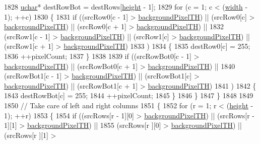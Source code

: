 \begin{DoxyCode}
1828     \hyperlink{namespace_k_k_b_ace9969169bf514f9ee6185186949cdf7}{uchar}*  destRowBot = destRows[\hyperlink{class_k_k_b_1_1_raster_af39ff189de4fbb6de98392e187efafb7}{height} - 1];
1829     \textcolor{keywordflow}{for} (c = 1;  c < (\hyperlink{class_k_k_b_1_1_raster_ae0bcc103e191c3421d7692dc69ceb554}{width}  - 1);  ++c)
1830     \{
1831       \textcolor{keywordflow}{if}  ((srcRow0[c - 1] > \hyperlink{class_k_k_b_1_1_raster_a3c4e96eaf48274f5d8912617f81f2a0b}{backgroundPixelTH})  ||  (srcRow0[c] > 
      \hyperlink{class_k_k_b_1_1_raster_a3c4e96eaf48274f5d8912617f81f2a0b}{backgroundPixelTH})  ||  (srcRow0[c + 1] > \hyperlink{class_k_k_b_1_1_raster_a3c4e96eaf48274f5d8912617f81f2a0b}{backgroundPixelTH})  ||
1832            (srcRow1[c - 1] > \hyperlink{class_k_k_b_1_1_raster_a3c4e96eaf48274f5d8912617f81f2a0b}{backgroundPixelTH})  ||  (srcRow1[c] > 
      \hyperlink{class_k_k_b_1_1_raster_a3c4e96eaf48274f5d8912617f81f2a0b}{backgroundPixelTH})  ||  (srcRow1[c + 1] > \hyperlink{class_k_k_b_1_1_raster_a3c4e96eaf48274f5d8912617f81f2a0b}{backgroundPixelTH})
1833           )
1834       \{
1835         destRow0[c] = 255;
1836         ++pixelCount;
1837       \}
1838 
1839       \textcolor{keywordflow}{if}  ((srcRowBot0[c - 1] > \hyperlink{class_k_k_b_1_1_raster_a3c4e96eaf48274f5d8912617f81f2a0b}{backgroundPixelTH})  ||                                    
             (srcRowBot0[c + 1] > \hyperlink{class_k_k_b_1_1_raster_a3c4e96eaf48274f5d8912617f81f2a0b}{backgroundPixelTH})  ||
1840            (srcRowBot1[c - 1] > \hyperlink{class_k_k_b_1_1_raster_a3c4e96eaf48274f5d8912617f81f2a0b}{backgroundPixelTH})  ||  (srcRowBot1[c] > 
      \hyperlink{class_k_k_b_1_1_raster_a3c4e96eaf48274f5d8912617f81f2a0b}{backgroundPixelTH})  ||  (srcRowBot1[c + 1] > \hyperlink{class_k_k_b_1_1_raster_a3c4e96eaf48274f5d8912617f81f2a0b}{backgroundPixelTH})
1841           )
1842       \{
1843         destRowBot[c] = 255;
1844         ++pixelCount;
1845       \}
1846     \}
1847   \}
1848 
1849 
1850   \textcolor{comment}{// Take care of left and right columns}
1851   \{
1852     \textcolor{keywordflow}{for}  (r = 1;  r < (\hyperlink{class_k_k_b_1_1_raster_af39ff189de4fbb6de98392e187efafb7}{height} - 1);  ++r)
1853     \{
1854       \textcolor{keywordflow}{if}  ((srcRows[r - 1][0] > \hyperlink{class_k_k_b_1_1_raster_a3c4e96eaf48274f5d8912617f81f2a0b}{backgroundPixelTH})  ||  (srcRows[r - 1][1] > 
      \hyperlink{class_k_k_b_1_1_raster_a3c4e96eaf48274f5d8912617f81f2a0b}{backgroundPixelTH})  ||
1855            (srcRows[r    ][0] > \hyperlink{class_k_k_b_1_1_raster_a3c4e96eaf48274f5d8912617f81f2a0b}{backgroundPixelTH})  ||  (srcRows[r    ][1] > 

\end{DoxyCode}
